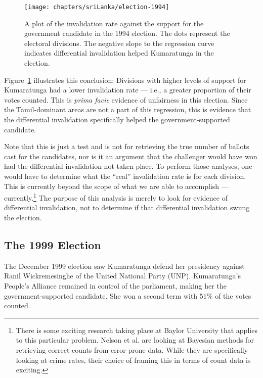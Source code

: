 \begin{figure}[t]
\texttt{[image: chapters/sriLanka/election-1994]}
\caption[Invalidation plot for the 1994 presidential election]{A plot of the invalidation rate against the support for the government candidate in the 1994 election. The dots represent the electoral divisions. The negative slope to the regression curve indicates differential invalidation helped Kumaratunga in the election.}
\label{fig:sri-elx1994}
\end{figure}

Figure~\ref{fig:sri-elx1994} illustrates this conclusion: Divisions with higher levels of support for Kumaratunga had a lower invalidation rate --- i.e., a greater proportion of their votes counted. This is \textit{prima facie} evidence of unfairness in this election. Since the Tamil-dominant areas are not a part of this regression, this is evidence that the differential invalidation specifically helped the government-supported candidate.

Note that this is just a test and is not for retrieving the true number of ballots cast for the candidates, nor is it an argument that the challenger would have won had the differential invalidation not taken place. To perform those analyses, one would have to determine what the ``real'' invalidation rate is for each division. This is currently beyond the scope of what we are able to accomplish --- currently.\footnote{There is some exciting research taking place at Baylor University that applies to this particular problem. Nelson et al. are looking at Bayesian methods for retrieving correct counts from error-prone data.\cite{nelson-etal-2018} While they are specifically looking at crime rates, their choice of framing this in terms of count data is exciting.} The purpose of this analysis is merely to look for evidence of differential invalidation, not to determine if that differential invalidation swung the election.








\subsection{The 1999 Election}
The December 1999 election saw Kumaratunga defend her presidency against Ranil Wickremesinghe of the United National Party (UNP). Kumaratunga's People's Alliance remained in control of the parliament, making her the government-supported candidate. She won a second term with 51\% of the votes counted.\cite{hensman-2010,shastri-2003,state-2004}


